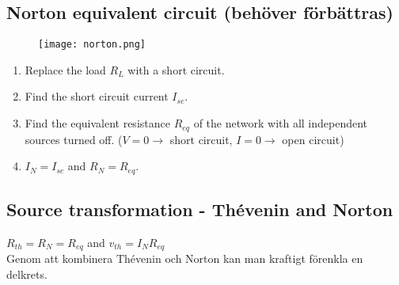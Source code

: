 \subsection{Norton equivalent circuit (behöver förbättras)}

\begin{figure}[H]
    \centering
        \texttt{[image: norton.png]}
    \label{fig:norton}
\end{figure}

\begin{enumerate}
    \item Replace the load \(R_L\) with a short circuit.
    \item Find the short circuit current \(I_{sc}\).
    \item Find the equivalent resistance \(R_{eq}\) of the network with all independent sources turned off. (\(V=0 \rightarrow \) short circuit, \( I=0 \rightarrow \) open circuit)
    \item \(I_N = I_{sc}\) and \(R_N = R_{eq}\).
\end{enumerate}

\subsection{Source transformation - Thévenin and Norton}
\(R_{th} = R_N = R_{eq}\) and \(v_{th} = I_NR_{eq}\)
\\
Genom att kombinera Thévenin och Norton kan man kraftigt förenkla en delkrets.
